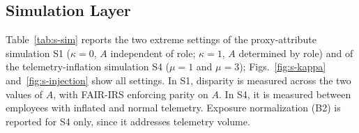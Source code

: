 \documentclass[10pt,onecolumn,letterpaper]{article}
\begin{document}
\begin{table}[!t]
\caption{Burden on Functional Unit $\times$ After-Hours Groups (r4.2)\label{tab:s-inter}}
\centering
{}
\end{table}

\subsection{Simulation Layer}
Table~\ref{tab:s-sim} reports the two extreme settings of the proxy-attribute simulation S1 ($\kappa=0$, $A$ independent of role; $\kappa=1$, $A$ determined by role) and of the telemetry-inflation simulation S4 ($\mu=1$ and $\mu=3$); Figs.~\ref{fig:s-kappa} and~\ref{fig:s-injection} show all settings. In S1, disparity is measured across the two values of $A$, with FAIR-IRS enforcing parity on $A$. In S4, it is measured between employees with inflated and normal telemetry. Exposure normalization (B2) is reported for S4 only, since it addresses telemetry volume.
\end{document}
